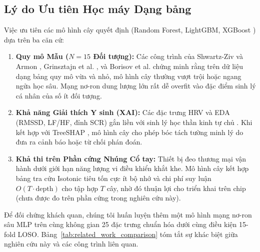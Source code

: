 \documentclass[conference]{IEEEtran}
\begin{document}
\subsection{Lý do Ưu tiên Học máy Dạng bảng}
Việc ưu tiên các mô hình cây quyết định (Random Forest, LightGBM, XGBoost \cite{chen2016xgboost}) dựa trên ba căn cứ:
\begin{enumerate}
    \item \textbf{Quy mô Mẫu ($N=15$ Đối tượng):} Các công trình của Shwartz-Ziv và Armon \cite{shwartzziv2022tabular}, Grinsztajn et al. \cite{grinsztajn2022why}, và Borisov et al. \cite{borisov2024deep} chứng minh rằng trên dữ liệu dạng bảng quy mô vừa và nhỏ, mô hình cây thường vượt trội hoặc ngang ngửa học sâu. Mạng nơ-ron dung lượng lớn rất dễ overfit vào đặc điểm sinh lý cá nhân của số ít đối tượng.
    \item \textbf{Khả năng Giải thích Y sinh (XAI):} Các đặc trưng HRV và EDA (RMSSD, LF/HF, đỉnh SCR) gắn liền với sinh lý học thần kinh tự chủ \cite{taskforce1996heart, makowski2021neurokit2, boucsein2012electrodermal, tarvainen2014kubios}. Khi kết hợp với TreeSHAP \cite{lundberg2020local}, mô hình cây cho phép bóc tách tường minh lý do đưa ra cảnh báo hoặc từ chối phán đoán.
    \item \textbf{Khả thi trên Phần cứng Nhúng Cổ tay:} Thiết bị đeo thương mại vận hành dưới giới hạn năng lượng vi điều khiển khắt khe. Mô hình cây kết hợp bảng tra cứu Isotonic tiêu tốn cực ít bộ nhớ và chi phí suy luận $O(T\cdot\text{depth})$ cho tập hợp $T$ cây, nhờ đó thuận lợi cho triển khai trên chip (chưa được đo trên phần cứng trong nghiên cứu này).
\end{enumerate}

Để đối chứng khách quan, chúng tôi huấn luyện thêm một mô hình mạng nơ-ron sâu MLP trên cùng không gian 25 đặc trưng chuẩn hóa dưới cùng điều kiện 15-fold LOSO. Bảng~\ref{tab:related_work_comparison} tóm tắt sự khác biệt giữa nghiên cứu này và các công trình liên quan.
\end{document}
